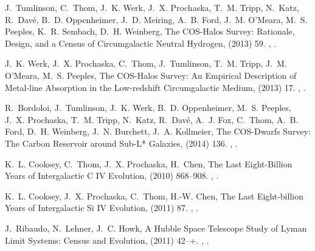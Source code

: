 \documentclass[12pt]{elsarticle}
\begin{document}
\begin{thebibliography}{10}
J.~{Tumlinson}, C.~{Thom}, J.~K. {Werk}, J.~X. {Prochaska}, T.~M. {Tripp},
  N.~{Katz}, R.~{Dav{\'e}}, B.~D. {Oppenheimer}, J.~D. {Meiring}, A.~B. {Ford},
  J.~M. {O'Meara}, M.~S. {Peeples}, K.~R. {Sembach}, D.~H. {Weinberg}, {The
  COS-Halos Survey: Rationale, Design, and a Census of Circumgalactic Neutral
  Hydrogen},  (2013) 59.
\newblock \href {http://arxiv.org/abs/1309.6317} {},
  \href {http://dx.doi.org/10.1088/0004-637X/777/1/59}
  {}.

J.~K. {Werk}, J.~X. {Prochaska}, C.~{Thom}, J.~{Tumlinson}, T.~M. {Tripp},
  J.~M. {O'Meara}, M.~S. {Peeples}, {The COS-Halos Survey: An Empirical
  Description of Metal-line Absorption in the Low-redshift Circumgalactic
  Medium},  (2013) 17.
\newblock \href {http://arxiv.org/abs/1212.0558} {},
  \href {http://dx.doi.org/10.1088/0067-0049/204/2/17}
  {}.

R.~{Bordoloi}, J.~{Tumlinson}, J.~K. {Werk}, B.~D. {Oppenheimer}, M.~S.
  {Peeples}, J.~X. {Prochaska}, T.~M. {Tripp}, N.~{Katz}, R.~{Dav{\'e}}, A.~J.
  {Fox}, C.~{Thom}, A.~B. {Ford}, D.~H. {Weinberg}, J.~N. {Burchett}, J.~A.
  {Kollmeier}, {The COS-Dwarfs Survey: The Carbon Reservoir around Sub-L*
  Galaxies},  (2014) 136.
\newblock \href {http://arxiv.org/abs/1406.0509} {},
  \href {http://dx.doi.org/10.1088/0004-637X/796/2/136}
  {}.

K.~L. {Cooksey}, C.~{Thom}, J.~X. {Prochaska}, H.~{Chen}, {The Last
  Eight-Billion Years of Intergalactic C IV Evolution},  (2010)
  868--908.
\newblock \href {http://arxiv.org/abs/0906.3347} {},
  \href {http://dx.doi.org/10.1088/0004-637X/708/1/868}
  {}.

K.~L. {Cooksey}, J.~X. {Prochaska}, C.~{Thom}, H.-W. {Chen}, {The Last
  Eight-billion Years of Intergalactic Si IV Evolution},  (2011) 87.
\newblock \href {http://arxiv.org/abs/1011.0750} {},
  \href {http://dx.doi.org/10.1088/0004-637X/729/2/87}
  {}.

J.~{Ribaudo}, N.~{Lehner}, J.~C. {Howk}, {A Hubble Space Telescope Study of
  Lyman Limit Systems: Census and Evolution},  (2011) 42--+.
\newblock \href {http://arxiv.org/abs/1105.0659} {},
  \href {http://dx.doi.org/10.1088/0004-637X/736/1/42}
  {}.


\end{thebibliography}
\end{document}
